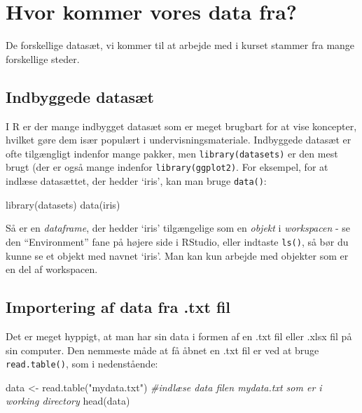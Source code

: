 \documentclass[
]{book}
\newenvironment{Shaded}{\begin{snugshade}}{\end{snugshade}}
\newcommand{\CommentTok}[1]{\textcolor[rgb]{0.56,0.35,0.01}{\textit{#1}}}
\newcommand{\FunctionTok}[1]{\textcolor[rgb]{0.00,0.00,0.00}{#1}}
\newcommand{\NormalTok}[1]{#1}
\newcommand{\OtherTok}[1]{\textcolor[rgb]{0.56,0.35,0.01}{#1}}
\newcommand{\StringTok}[1]{\textcolor[rgb]{0.31,0.60,0.02}{#1}}
\begin{document}
\hypertarget{hvor-kommer-vores-data-fra}{%
\section{Hvor kommer vores data fra?}\label{hvor-kommer-vores-data-fra}}

De forskellige datasæt, vi kommer til at arbejde med i kurset stammer fra mange forskellige steder.

\hypertarget{indbyggede-datasuxe6t}{%
\subsection{Indbyggede datasæt}\label{indbyggede-datasuxe6t}}

I R er der mange indbygget datasæt som er meget brugbart for at vise koncepter, hvilket gøre dem især populært i undervisningsmateriale. Indbyggede datasæt er ofte tilgængligt indenfor mange pakker, men \texttt{library(datasets)} er den mest brugt (der er også mange indenfor \texttt{library(ggplot2)}. For eksempel, for at indlæse datasættet, der hedder `iris', kan man bruge \texttt{data()}:

\begin{Shaded}
\begin{Highlighting}[]
\FunctionTok{library}\NormalTok{(datasets)}
\FunctionTok{data}\NormalTok{(iris)}
\end{Highlighting}
\end{Shaded}

Så er en \emph{dataframe}, der hedder `iris' tilgængelige som en \emph{objekt} i \emph{workspacen} - se den ``Environment'' fane på højere side i RStudio, eller indtaste \texttt{ls()}, så bør du kunne se et objekt med navnet `iris'. Man kan kun arbejde med objekter som er en del af workspacen.

\hypertarget{importering-af-data-fra-.txt-fil}{%
\subsection{Importering af data fra .txt fil}\label{importering-af-data-fra-.txt-fil}}

Det er meget hyppigt, at man har sin data i formen af en .txt fil eller .xlsx fil på sin computer. Den nemmeste måde at få åbnet en .txt fil er ved at bruge \texttt{read.table()}, som i nedenstående:

\begin{Shaded}
\begin{Highlighting}[]
\NormalTok{data }\OtherTok{\textless{}{-}} \FunctionTok{read.table}\NormalTok{(}\StringTok{"mydata.txt"}\NormalTok{) }\CommentTok{\#indlæse data filen mydata.txt som er i working directory}
\FunctionTok{head}\NormalTok{(data)}
\end{Highlighting}
\end{Shaded}
\end{document}
